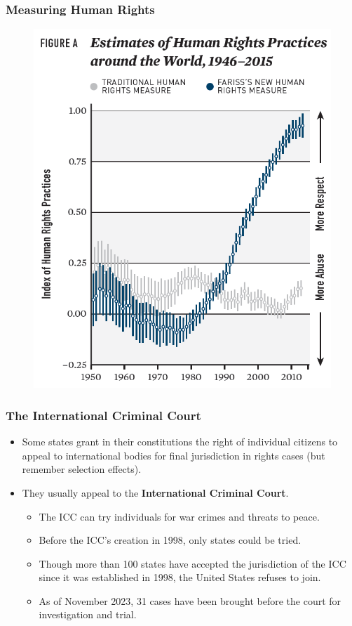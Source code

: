 \documentclass{beamer}
\begin{document}
\begin{frame} 
	\frametitle{\LARGE{Measuring Human Rights}}
	\begin{figure}[ht!]
		\centering
		\includegraphics[width=\textwidth,height=0.9\textheight,keepaspectratio]{./farriss.png}
	\end{figure}
\end{frame}


\begin{frame} 
	\frametitle{\LARGE{The International Criminal Court}}
	\begin{itemize}
		\item Some states grant in their constitutions the right of individual citizens to appeal to international bodies for final jurisdiction in rights cases (but remember selection effects). 
		\item They usually appeal to the \textbf{International Criminal Court}.
		\begin{itemize}
			\item The ICC can try individuals for war crimes and threats to peace.
			\item Before the ICC’s creation in 1998, only states could be tried.
			\item Though more than 100 states have accepted the jurisdiction of the ICC since it was established in 1998, the United States refuses to join. 
			\item As of November 2023, 31 cases have been brought before the court for investigation and trial.
		\end{itemize}
	\end{itemize}
\end{frame}
\end{document}
